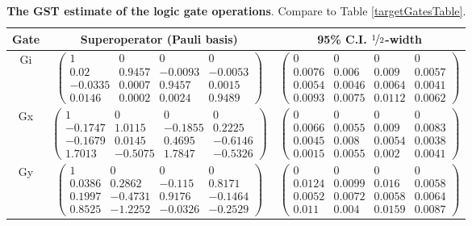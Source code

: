 \documentclass{article}[11pt]
\begin{document}
\begin{table}[h]
\begin{center}
\begin{tabular}[l]{|c|c|c|}
\hline
Gate & Superoperator (Pauli basis) & 95\% C.I. $\nicefrac{1}{2}$-width \\ \hline
Gi & $ \left(\!\!\begin{array}{cccc}
1 & 0 & 0 & 0 \\ 
0.02 & 0.9457 & -0.0093 & -0.0053 \\ 
-0.0335 & 0.0007 & 0.9457 & 0.0015 \\ 
0.0146 & 0.0002 & 0.0024 & 0.9489
 \end{array}\!\!\right) $
 & $ \left(\!\!\begin{array}{cccc}
0 & 0 & 0 & 0 \\ 
0.0076 & 0.006 & 0.009 & 0.0057 \\ 
0.0054 & 0.0046 & 0.0064 & 0.0041 \\ 
0.0093 & 0.0075 & 0.0112 & 0.0062
 \end{array}\!\!\right) $
 \\ \hline
Gx & $ \left(\!\!\begin{array}{cccc}
1 & 0 & 0 & 0 \\ 
-0.1747 & 1.0115 & -0.1855 & 0.2225 \\ 
-0.1679 & 0.0145 & 0.4695 & -0.6146 \\ 
1.7013 & -0.5075 & 1.7847 & -0.5326
 \end{array}\!\!\right) $
 & $ \left(\!\!\begin{array}{cccc}
0 & 0 & 0 & 0 \\ 
0.0066 & 0.0055 & 0.009 & 0.0083 \\ 
0.0045 & 0.008 & 0.0054 & 0.0038 \\ 
0.0015 & 0.0055 & 0.002 & 0.0041
 \end{array}\!\!\right) $
 \\ \hline
Gy & $ \left(\!\!\begin{array}{cccc}
1 & 0 & 0 & 0 \\ 
0.0386 & 0.2862 & -0.115 & 0.8171 \\ 
0.1997 & -0.4731 & 0.9176 & -0.1464 \\ 
0.8525 & -1.2252 & -0.0326 & -0.2529
 \end{array}\!\!\right) $
 & $ \left(\!\!\begin{array}{cccc}
0 & 0 & 0 & 0 \\ 
0.0124 & 0.0099 & 0.016 & 0.0058 \\ 
0.0052 & 0.0072 & 0.0058 & 0.0064 \\ 
0.011 & 0.004 & 0.0159 & 0.0087
 \end{array}\!\!\right) $
 \\ \hline
\end{tabular}

\caption{\textbf{The GST estimate of the logic gate operations}.  Compare to Table \ref{targetGatesTable}.\label{bestGatesetGatesTable}}
\end{center}
\end{table}
\end{document}
